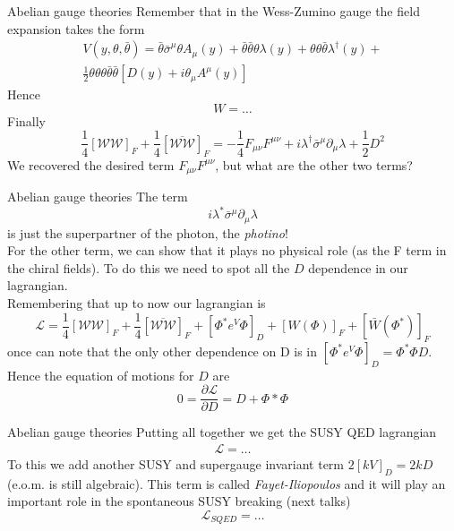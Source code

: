 \documentclass[10pt]{beamer}
\begin{document}
\begin{frame}{Abelian gauge theories}
Remember that in the Wess-Zumino gauge the field expansion takes the form 
\begin{gather*}
    V(y, \theta, \bar \theta) = \bar\theta \bar{\sigma}^{\mu} \theta A_{\mu}(y)+\bar\theta \bar\theta \theta \lambda(y)+\theta \theta \bar\theta \lambda^{\dagger}(y) + \\ 
    \frac{1}{2} \theta \theta \theta \bar\theta \bar\theta\left[D(y)+i \theta_{\mu} A^{\mu}(y)\right]
\end{gather*}
Hence 
\begin{equation*}
    W = \dots
\end{equation*}
Finally 
\begin{equation*}
    \frac{1}{4}\left[\mathcal{WW}\right]_F + \frac{1}{4} \left[\overline{\mathcal{WW}}\right]_F = -\frac{1}{4} F_{\mu\nu} F^{\mu\nu} + i \lambda^{\dagger} \bar\sigma^{\mu} \partial_{\mu} \lambda + \frac{1}{2} D^2
\end{equation*}
We recovered the desired term $F_{\mu\nu}F^{\mu\nu}$, but what are the other two terms?
\end{frame}

\begin{frame}{Abelian gauge theories}
The term 
\begin{equation*}
    i\lambda^* \bar\sigma^{\mu}\partial_{\mu} \lambda
\end{equation*}
is just the superpartner of the photon, the \emph{photino}! \\
For the other term, we can show that it plays no physical role (as the F term in the chiral fields). To do this we need to spot all the $D$ dependence in our lagrangian. \\
Remembering that up to now our lagrangian is 
\begin{equation*}
    \mathcal{L} = \frac{1}{4}\left[\mathcal{WW}\right]_F + \frac{1}{4} \left[\overline{\mathcal{WW}}\right]_F + \left[\Phi^* e^V \Phi\right]_D + [W(\Phi)]_F + [\bar W(\Phi^*)]_F
\end{equation*}
once can note that the only other dependence on D is in $\left[\Phi^* e^V \Phi \right]_D = \Phi^*\Phi D$.
Hence the equation of motions for $D$ are
\begin{equation*}
    0 = \frac{\partial \mathcal{L}}{\partial D} = D + \Phi* \Phi 
\end{equation*}
\end{frame}

\begin{frame}{Abelian gauge theories}
Putting all together we get the SUSY QED lagrangian 
\begin{gather*}
    \mathcal{L} = \dots
\end{gather*}
To this we add another SUSY and supergauge invariant term $2[kV]_D = 2kD$ (e.o.m. is still algebraic). 
This term is called \emph{Fayet-Iliopoulos} and it will play an important role in the spontaneous SUSY breaking (next talks)
\begin{equation*}
    \boxed{\mathcal{L}_{SQED} = \dots}
\end{equation*}
\end{frame}
\end{document}
